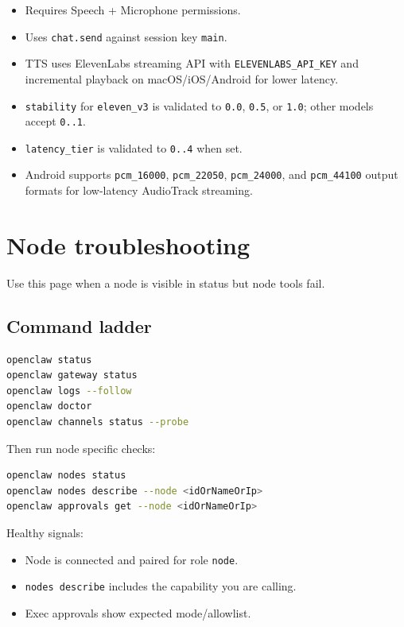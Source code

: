 \begin{itemize}
  \item Requires Speech + Microphone permissions.
  \item Uses \texttt{chat.send} against session key \texttt{main}.
  \item TTS uses ElevenLabs streaming API with \texttt{ELEVENLABS\_API\_KEY} and incremental playback on macOS/iOS/Android for lower latency.
  \item \texttt{stability} for \texttt{eleven\_v3} is validated to \texttt{0.0}, \texttt{0.5}, or \texttt{1.0}; other models accept \texttt{0..1}.
  \item \texttt{latency\_tier} is validated to \texttt{0..4} when set.
  \item Android supports \texttt{pcm\_16000}, \texttt{pcm\_22050}, \texttt{pcm\_24000}, and \texttt{pcm\_44100} output formats for low-latency AudioTrack streaming.
\end{itemize}



\clearpage

\section{Node troubleshooting}


Use this page when a node is visible in status but node tools fail.

\subsection{Command ladder}


\begin{lstlisting}[language=bash]
openclaw status
openclaw gateway status
openclaw logs --follow
openclaw doctor
openclaw channels status --probe
\end{lstlisting}


Then run node specific checks:

\begin{lstlisting}[language=bash]
openclaw nodes status
openclaw nodes describe --node <idOrNameOrIp>
openclaw approvals get --node <idOrNameOrIp>
\end{lstlisting}


Healthy signals:

\begin{itemize}
  \item Node is connected and paired for role \texttt{node}.
  \item \texttt{nodes describe} includes the capability you are calling.
  \item Exec approvals show expected mode/allowlist.
\end{itemize}


